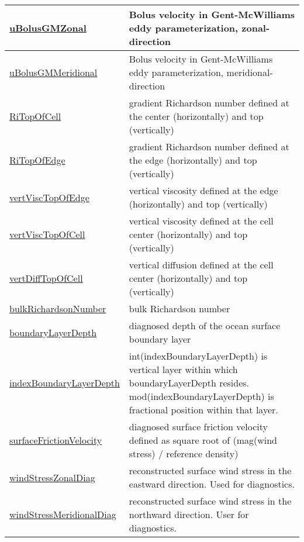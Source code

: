 {\begin{center}
\begin{longtable}{| p{2.0in} | p{4.0in} |}
	\hline
	\hyperref[subsec:var_sec_diagnostics_uBolusGMZonal]{uBolusGMZonal} & Bolus velocity in Gent-McWilliams eddy parameterization, zonal-direction \\
	\hline
	\hyperref[subsec:var_sec_diagnostics_uBolusGMMeridional]{uBolusGMMeridional} & Bolus velocity in Gent-McWilliams eddy parameterization, meridional-direction \\
	\hline
	\hyperref[subsec:var_sec_diagnostics_RiTopOfCell]{RiTopOfCell} & gradient Richardson number defined at the center (horizontally) and top (vertically) \\
	\hline
	\hyperref[subsec:var_sec_diagnostics_RiTopOfEdge]{RiTopOfEdge} & gradient Richardson number defined at the edge (horizontally) and top (vertically) \\
	\hline
	\hyperref[subsec:var_sec_diagnostics_vertViscTopOfEdge]{vertViscTopOfEdge} & vertical viscosity defined at the edge (horizontally) and top (vertically) \\
	\hline
	\hyperref[subsec:var_sec_diagnostics_vertViscTopOfCell]{vertViscTopOfCell} & vertical viscosity defined at the cell center (horizontally) and top (vertically) \\
	\hline
	\hyperref[subsec:var_sec_diagnostics_vertDiffTopOfCell]{vertDiffTopOfCell} & vertical diffusion defined at the cell center (horizontally) and top (vertically) \\
	\hline
	\hyperref[subsec:var_sec_diagnostics_bulkRichardsonNumber]{bulkRichardsonNumber} & bulk Richardson number \\
	\hline
	\hyperref[subsec:var_sec_diagnostics_boundaryLayerDepth]{boundaryLayerDepth} & diagnosed depth of the ocean surface boundary layer \\
	\hline
	\hyperref[subsec:var_sec_diagnostics_indexBoundaryLayerDepth]{indexBoundaryLayerDepth} & int(indexBoundaryLayerDepth) is vertical layer within which boundaryLayerDepth resides. mod(indexBoundaryLayerDepth) is fractional position within that layer. \\
	\hline
	\hyperref[subsec:var_sec_diagnostics_surfaceFrictionVelocity]{surfaceFrictionVelocity} & diagnosed surface friction velocity defined as square root of (mag(wind stress) / reference density) \\
	\hline
	\hyperref[subsec:var_sec_diagnostics_windStressZonalDiag]{windStressZonalDiag} & reconstructed surface wind stress in the eastward direction. Used for diagnostics. \\
	\hline
	\hyperref[subsec:var_sec_diagnostics_windStressMeridionalDiag]{windStressMeridionalDiag} & reconstructed surface wind stress in the northward direction. User for diagnostics. \\

\end{longtable}
\end{center}}

